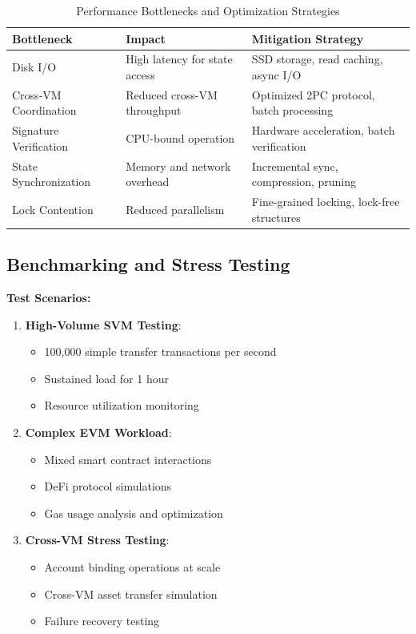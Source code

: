 \documentclass[11pt,a4paper]{article}
\begin{document}
\begin{table}[H]
\centering
\begin{tabular}{|p{3cm}|p{4cm}|p{6cm}|}
\hline
\textbf{Bottleneck} & \textbf{Impact} & \textbf{Mitigation Strategy} \\
\hline
\hline
Disk I/O & High latency for state access & SSD storage, read caching, async I/O \\
\hline
Cross-VM Coordination & Reduced cross-VM throughput & Optimized 2PC protocol, batch processing \\
\hline
Signature Verification & CPU-bound operation & Hardware acceleration, batch verification \\
\hline
State Synchronization & Memory and network overhead & Incremental sync, compression, pruning \\
\hline
Lock Contention & Reduced parallelism & Fine-grained locking, lock-free structures \\
\hline
\end{tabular}
\caption{Performance Bottlenecks and Optimization Strategies}
\label{tab:bottlenecks}
\end{table}

\subsection{Benchmarking and Stress Testing}

\textbf{Test Scenarios:}

\begin{enumerate}
    \item \textbf{High-Volume SVM Testing}:
    \begin{itemize}
        \item 100,000 simple transfer transactions per second
        \item Sustained load for 1 hour
        \item Resource utilization monitoring
    \end{itemize}
    
    \item \textbf{Complex EVM Workload}:
    \begin{itemize}
        \item Mixed smart contract interactions
        \item DeFi protocol simulations
        \item Gas usage analysis and optimization
    \end{itemize}
    
    \item \textbf{Cross-VM Stress Testing}:
    \begin{itemize}
        \item Account binding operations at scale
        \item Cross-VM asset transfer simulation
        \item Failure recovery testing
    \end{itemize}
\end{enumerate}
\end{document}
